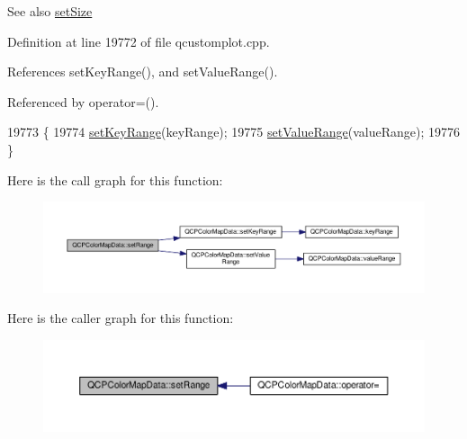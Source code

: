 \begin{DoxySeeAlso}{See also}
\hyperlink{class_q_c_p_color_map_data_a0d9ff35c299d0478b682bfbcdd9c097e}{set\+Size} 
\end{DoxySeeAlso}


Definition at line 19772 of file qcustomplot.\+cpp.



References set\+Key\+Range(), and set\+Value\+Range().



Referenced by operator=().


\begin{DoxyCode}
19773 \{
19774   \hyperlink{class_q_c_p_color_map_data_a0738c485f3c9df9ea1241b7a8bb6a86e}{setKeyRange}(keyRange);
19775   \hyperlink{class_q_c_p_color_map_data_ada1b2680ba96a5f4175b6d341cf75d23}{setValueRange}(valueRange);
19776 \}
\end{DoxyCode}


Here is the call graph for this function\+:\nopagebreak
\begin{figure}[H]
\begin{center}
\leavevmode
\includegraphics[width=350pt]{class_q_c_p_color_map_data_aad9c1c7c703c1339489fc730517c83d4_cgraph}
\end{center}
\end{figure}




Here is the caller graph for this function\+:\nopagebreak
\begin{figure}[H]
\begin{center}
\leavevmode
\includegraphics[width=350pt]{class_q_c_p_color_map_data_aad9c1c7c703c1339489fc730517c83d4_icgraph}
\end{center}
\end{figure}


\hypertarget{class_q_c_p_color_map_data_a0d9ff35c299d0478b682bfbcdd9c097e}{}
